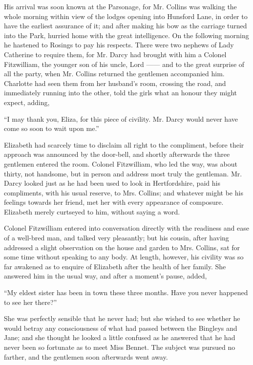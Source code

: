 His arrival was soon known at the Parsonage, for
Mr. Collins was walking the whole morning within view
of the lodges opening into Hunsford Lane, in order to
have the earliest assurance of it; and after making his
bow as the carriage turned into the Park, hurried home
with the great intelligence. On the following morning
he hastened to Rosings to pay his respects. There were
two nephews of Lady Catherine to require them, for
Mr. Darcy had brought with him a Colonel Fitzwilliam,
the younger son of his uncle, Lord ------ and to the great
surprise of all the party, when Mr. Collins returned the
gentlemen accompanied him. Charlotte had seen them
from her husband’s room, crossing the road, and immediately
running into the other, told the girls what an
honour they might expect, adding,

“I may thank you, Eliza, for this piece of civility.
Mr. Darcy would never have come so soon to wait upon
me.”

Elizabeth had scarcely time to disclaim all right to
the compliment, before their approach was announced by
the door-bell, and shortly afterwards the three gentlemen
entered the room. Colonel Fitzwilliam, who led the way,
was about thirty, not handsome, but in person and address
most truly the gentleman. Mr. Darcy looked just as he
had been used to look in Hertfordshire, paid his compliments,
with his usual reserve, to Mrs. Collins; and
whatever might be his feelings towards her friend, met
her with every appearance of composure. Elizabeth
merely curtseyed to him, without saying a word.

Colonel Fitzwilliam entered into conversation directly
with the readiness and ease of a well-bred man, and talked
very pleasantly; but his cousin, after having addressed
a slight observation on the house and garden to Mrs.
Collins, sat for some time without speaking to any body.
At length, however, his civility was so far awakened as
to enquire of Elizabeth after the health of her family.
She answered him in the usual way, and after a moment’s
pause, added,

“My eldest sister has been in town these three months.
Have you never happened to see her there?”

She was perfectly sensible that he never had; but she
wished to see whether he would betray any consciousness
of what had passed between the Bingleys and Jane; and
she thought he looked a little confused as he answered
that he had never been so fortunate as to meet Miss
Bennet. The subject was pursued no farther, and the
gentlemen soon afterwards went away.

